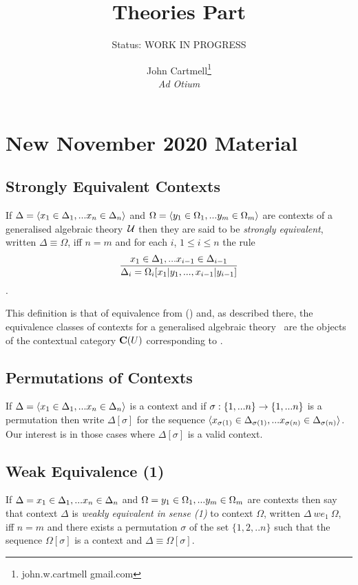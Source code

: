 \documentclass[10pt,a4paper]{scrartcl}
\title{ Theories Part}
\author{John Cartmell\footnote{john.w.cartmell gmail.com}\\ \normalsize{\textit{Ad Otium}}}
\subtitle{Status: \normalsize{WORK IN PROGRESS}}
\begin{document}
\maketitle

\section{New November 2020 Material}

\newcommand{\sEquiv}{\equiv}
\newcommand{\wEquivOne}[2]{#1\ we_1\ #2}
\newcommand{\wEquivTwo}[2]{#1\ we_2\ #2}
\newcommand{\GAT}{generalised algebraic theory\ }

\subsection{Strongly Equivalent Contexts}
\begin{definition}
If  $\Delta= \langle x_1 \in \Delta_1,... x_{n} \in \Delta_{n}\rangle$ 
and $\Omega = \langle y_1 \in \Omega_1,... y_{m} \in \Omega_{m}\rangle$ are contexts of a \GAT $\mathcal{U}$ then they are said to be \textit{strongly equivalent}, written $\Delta \sEquiv \Omega$,  iff $n=m$ and for each $i$, $1 \leq i \leq n$ the rule 
$$
\frac{x_1 \in \Delta_1,... x_{i-1} \in \Delta_{i-1}}{\Delta_i=\Omega_i[x_1|y_1,...,x_{i-1}|y_{i-1}]}
$$
\intheory.
\end{definition}

This definition is that of equivalence from (\cite{Cartmell78})  and, as described there, the  equivalence classes of contexts for a generalised algebraic theory \gat\  are the objects of the contextual category $\mathbf{C}(U)$ corresponding to \gat.

\subsection{Permutations of Contexts}
If $\Delta = \langle x_1 \in \Delta_1,... x_{n} \in \Delta_{n}\rangle$ is a context and if $\sigma: \left\{1,...n\right\} \rightarrow \left\{1,...n\right\}$ is a permutation then write $\Delta[\sigma]$ for the
sequence $\langle x_{\sigma(1)} \in \Delta_{\sigma(1)},... x_{\sigma(n)} \in \Delta_{\sigma(n)}\rangle$. Our  interest is in those cases where $\Delta[\sigma]$ is a valid context.  

\subsection{Weak Equivalence (1)}
\begin{definition}
If $\Delta = x_1 \in \Delta_1,... x_{n} \in \Delta_{n}$ and $\Omega=y_1 \in \Omega_1,... y_{m} \in \Omega_{m}$ are contexts then say that context $\Delta$
is \textit{weakly equivalent in sense (1) } to context $\Omega$, written $\wEquivOne{\Delta}{\Omega}$,  iff $n=m$ and there exists a permutation $\sigma$ of the set $\{1,2,..n\}$
such that the sequence $\Omega[\sigma]$ 
is a context and $\Delta \sEquiv \Omega[\sigma]$.
\end{definition}
\end{document}
